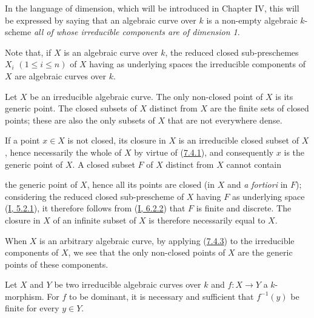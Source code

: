 In the language of dimension, which will be introduced in Chapter IV, this
will be expressed by saying that an algebraic curve over $k$ is a non-empty
algebraic $k$-scheme \emph{all of whose irreducible components are of
dimension 1}.

Note that, if $X$ is an algebraic curve over $k$, the reduced closed
sub-preschemes $X_i$ $(1\leq i\leq n)$ of $X$ having as underlying spaces
the irreducible components of $X$ are algebraic curves over $k$.

\begin{corollary}[7.4.3]
\label{II.7.4.3}
Let $X$ be an irreducible algebraic curve. The only non-closed point of $X$ is
its generic point. The closed subsets of $X$ distinct from $X$ are the
finite sets of closed points; these are also the only subsets of $X$ that
are not everywhere dense.
\end{corollary}

If a point $x\in X$ is not closed, its closure in $X$ is an irreducible
closed subset of $X$, hence necessarily the whole of $X$ by virtue of
(\hyperref[II.7.4.1]{7.4.1}), and consequently $x$ is the generic point of
$X$. A closed subset $F$ of $X$ distinct from $X$ cannot contain

the generic point of $X$, hence all its points are closed (in $X$ and
\emph{a fortiori} in $F$); considering the reduced closed sub-prescheme of
$X$ having $F$ as underlying space (\hyperref[I.5.2.1]{I, 5.2.1}), it
therefore follows from (\hyperref[I.6.2.2]{I, 6.2.2}) that $F$ is finite and
discrete. The closure in $X$ of an infinite subset of $X$ is therefore
necessarily equal to $X$.

When $X$ is an arbitrary algebraic curve, by applying
(\hyperref[II.7.4.3]{7.4.3}) to the irreducible components of $X$, we see
that the only non-closed points of $X$ are the generic points of these
components.

\begin{corollary}[7.4.4]
\label{II.7.4.4}
Let $X$ and $Y$ be two irreducible algebraic curves over $k$ and $f:X\to Y$
a $k$-morphism. For $f$ to be dominant, it is necessary and sufficient that
$f^{-1}(y)$ be finite for every $y\in Y$.
\end{corollary}

